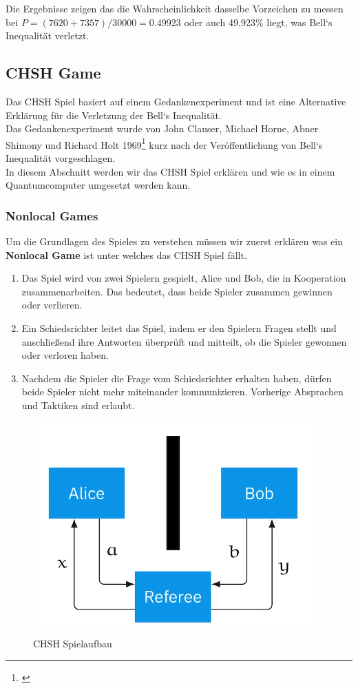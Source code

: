 Die Ergebnisse zeigen das die Wahrscheinlichkeit dasselbe Vorzeichen zu messen bei $P = (7620 + 7357) / 30000 = 0.49923$ oder auch 49,923\% liegt, was Bell`s Inequalität verletzt.\\


\subsection{CHSH Game}
\label{subsec:chsh_experimentell}
Das CHSH Spiel basiert auf einem Gedankenexperiment und ist eine Alternative Erklärung für die Verletzung der Bell`s Inequalität.\\
Das Gedankenexperiment wurde von John Clauser, Michael Horne, Abner Shimony und Richard Holt 1969\footnote{\cite{clauser_proposed_1969}} kurz nach der Veröffentlichung von Bell`s Inequalität vorgeschlagen.\\

In diesem Abschnitt werden wir das CHSH Spiel erklären und wie es in einem Quantumcomputer umgesetzt werden kann.\\

\subsubsection{Nonlocal Games}
\label{subsubsec:chsh_nonlocal}

Um die Grundlagen des Spieles zu verstehen müssen wir zuerst erklären was ein \textbf{Nonlocal Game} ist unter welches das CHSH Spiel fällt.
\begin{enumerate}
    \item Das Spiel wird von zwei Spielern gespielt, Alice und Bob, die in Kooperation zusammenarbeiten. Das bedeutet, dass beide Spieler zusammen gewinnen oder verlieren.
    \item Ein Schiedsrichter leitet das Spiel, indem er den Spielern Fragen stellt und anschließend ihre Antworten überprüft und mitteilt, ob die Spieler gewonnen oder verloren haben.
    \item Nachdem die Spieler die Frage vom Schiedsrichter erhalten haben, dürfen beide Spieler nicht mehr miteinander kommunizieren. Vorherige Absprachen und Taktiken sind erlaubt.
\end{enumerate}

\begin{figure}[H]
    \centering
    \includegraphics[width=0.6\linewidth]{img/CHSH-drawing.png}
    \caption{CHSH Spielaufbau \protect\cite[47m20s]{IBM_chsh_2025}}
    \label{fig:CHSHGame}
\end{figure}


